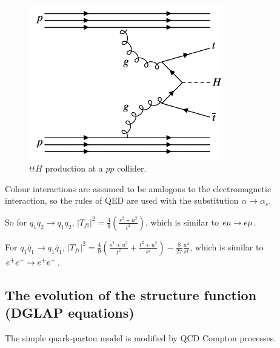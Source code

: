 \begin{figure}[!htb]
  \begin{center}
    \includegraphics[width=0.75\textwidth]{images/web_feynman/image_66.png}
    \caption[$ttH$ production]{$ttH$ production at a $pp$ collider.}
    \label{fig:ch14_DrellYanUDToENu}
  \end{center}
\end{figure}

Colour interactions are assumed to be analogous to the electromagnetic interaction, so the rules of QED are used with the substitution $\alpha \to \alpha_s$.

So for $q_1 q_2 \to q_1 q_2$, $|T_{fi}|^2 = \frac{4}{9}\left(\frac{s^2 + u^2}{t^2}\right)$, which is similar to $e\mu \to e\mu$.

For $q_1 \bar{q}_1 \to q_1 \bar{q}_1$, $|T_{fi}|^2 = \frac{4}{9}\left(\frac{s^2 + u^2}{t^2} + \frac{t^2 + u^2}{s^2}\right) - \frac{8}{27}\frac{u^2}{st}$, which is similar to $e^+e^- \to e^+e^-$.

\subsection{The evolution of the structure function (DGLAP equations)}

The simple quark-parton model is modified by QCD Compton processes.

